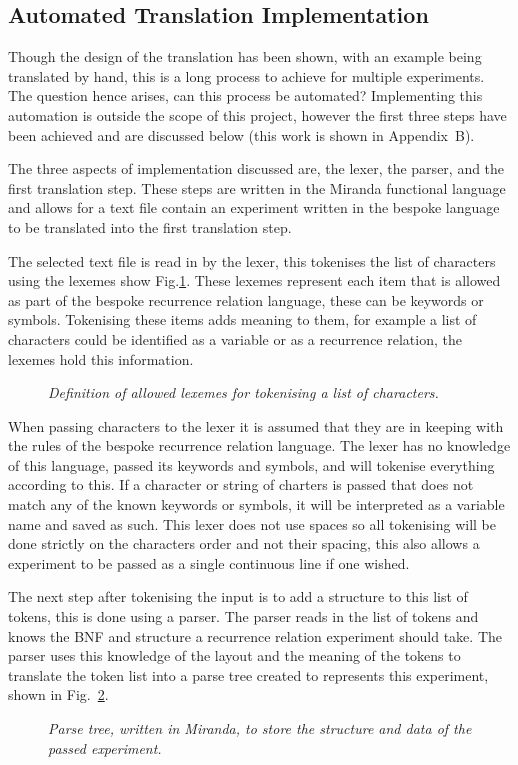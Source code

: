 \documentclass{article}
\begin{document}
\subsection{Automated Translation Implementation}
Though the design of the translation has been shown, with an example being translated by hand, this is a long process to achieve for multiple experiments. The question hence arises, can this process be automated? Implementing this automation is outside the scope of this project, however the first three steps have been achieved and are discussed below (this work is shown in Appendix~B). 

The three aspects of implementation discussed are, the lexer, the parser, and the first translation step. These steps are written in the Miranda functional language and allows for a text file contain an experiment written in the bespoke language to be translated into the first translation step. 

The selected text file is read in by the lexer, this tokenises the list of characters using the lexemes show Fig.\ref{fig:tokens}. These lexemes represent each item that is allowed as part of the bespoke recurrence relation language, these can be keywords or symbols. Tokenising these items adds meaning to them, for example a list of characters could be identified as a variable or as a recurrence relation, the lexemes hold this information. 
\begin{figure}[H]
	\centering
	
	\caption{\it Definition of allowed lexemes for tokenising a list of characters.}
	\label{fig:tokens}
\end{figure} 

When passing characters to the lexer it is assumed that they are in keeping with the rules of the bespoke recurrence relation language. The lexer has no knowledge of this language, passed its keywords and symbols, and will tokenise everything according to this. If a character or string of charters is passed that does not match any of the known keywords  or symbols, it will be interpreted as a variable name and saved as such. This lexer does not use spaces so all tokenising will be done strictly on the characters order and not their spacing, this also allows a experiment to be passed as a single continuous line if one wished. 

The next step after tokenising the input is to add a structure to this list of tokens, this is done using a parser. The parser reads in the list of tokens and knows the BNF and structure a recurrence relation experiment should take. The parser uses this knowledge of the layout and the meaning of the tokens to translate the token list into a parse tree created to represents this experiment, shown in Fig.~\ref{fig:parsetreecodemira}.  
\begin{figure}[H]
	\centering
	\caption{\it Parse tree, written in Miranda, to store the structure and data of the passed experiment.}
	\label{fig:parsetreecodemira}
\end{figure} 
\end{document}
